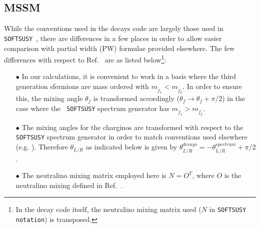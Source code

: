 \documentclass[final,3p,times]{elsarticle}
\begin{document}
\subsection{MSSM} \label{MSSMconventions}
While the conventions used in the decays code are largely those used in {\tt
  SOFTSUSY}~\cite{Allanach:2001kg}, there are differences in a few places in
order to allow easier comparison with partial width (PW) formulae provided
elsewhere. The few differences with respect to Ref.~\cite{Allanach:2001kg} are
as listed below\footnote{In the decay code itself, the neutralino mixing
  matrix used ($N$ in {\tt SOFTSUSY notation}) is transposed.}: 
\begin{itemize}
	\item[$\bullet$] In our calculations, it is convenient to work in a
          basis where the third generation sfermions are mass
          ordered with $m_{\tilde{f}_1} < m_{\tilde{f}_2}$. In order to ensure
          this, the mixing angle $\theta_f$ is transformed accordingly
          ($\theta_f \rightarrow \theta_f + \pi/2$) in the case where the {\tt
            SOFTSUSY} spectrum generator has $m_{\tilde{f}_1} >
          m_{\tilde{f}_2}$. 
	\item[$\bullet$] The mixing angles for the charginos are transformed
          with respect to the {\tt SOFTSUSY} spectrum generator in order to
          match conventions used elsewhere
          (e.g. \cite{Djouadi:2002ze}). Therefore $\theta_{L/R}$ as indicated
          below is given by $\theta_{L/R}^{decays} = -\theta_{L/R}^{spectrum}
          + \pi/2$. 
         \item[$\bullet$] The neutralino mixing matrix employed here is
           $N=O^T$, where $O$ is the neutralino mixing defined in
           Ref.~\cite{Allanach:2001kg}. 
\end{itemize}
\end{document}
